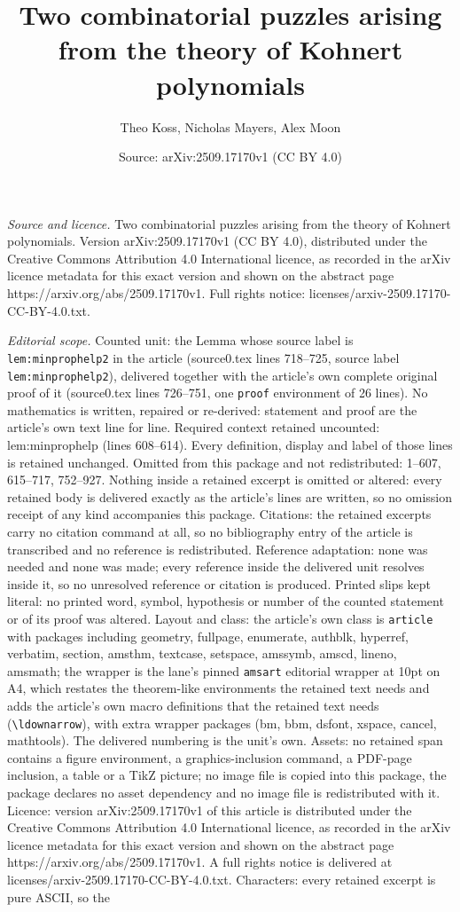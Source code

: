 \documentclass[10pt,a4paper]{amsart}
\title[Two combinatorial puzzles arising from the theory of Kohnert]{Two combinatorial puzzles arising from the theory of Kohnert polynomials}
\author{Theo Koss, Nicholas Mayers, Alex Moon}
\date{Source: arXiv:2509.17170v1 (CC BY 4.0)}
\begin{document}
\maketitle

\noindent\emph{Source and licence.} Two combinatorial puzzles arising from the theory of Kohnert polynomials. Version arXiv:2509.17170v1 (CC BY 4.0), distributed under the Creative Commons Attribution 4.0 International licence, as recorded in the arXiv licence metadata for this exact version and shown on the abstract page https://arxiv.org/abs/2509.17170v1. Full rights notice: licenses/arxiv-2509.17170-CC-BY-4.0.txt.\par\smallskip

\noindent\textit{Editorial scope.} Counted unit: the Lemma whose source label is \texttt{lem:minprophelp2} in the article (source0.tex lines 718--725, source label \texttt{lem:minprophelp2}), delivered together with the article's own complete original proof of it (source0.tex lines 726--751, one \texttt{proof} environment of 26 lines). No mathematics is written, repaired or re-derived: statement and proof are the article's own text line for line. Required context retained uncounted: lem:minprophelp (lines 608--614). Every definition, display and label of those lines is retained unchanged. Omitted from this package and not redistributed: 1--607, 615--717, 752--927. Nothing inside a retained excerpt is omitted or altered: every retained body is delivered exactly as the article's lines are written, so no omission receipt of any kind accompanies this package. Citations: the retained excerpts carry no citation command at all, so no bibliography entry of the article is transcribed and no reference is redistributed. Reference adaptation: none was needed and none was made; every reference inside the delivered unit resolves inside it, so no unresolved reference or citation is produced. Printed slips kept literal: no printed word, symbol, hypothesis or number of the counted statement or of its proof was altered. Layout and class: the article's own class is \texttt{article} with packages including geometry, fullpage, enumerate, authblk, hyperref, verbatim, section, amsthm, textcase, setspace, amssymb, amscd, lineno, amsmath; the wrapper is the lane's pinned \texttt{amsart} editorial wrapper at 10pt on A4, which restates the theorem-like environments the retained text needs and adds the article's own macro definitions that the retained text needs (\texttt{\textbackslash ldownarrow}), with extra wrapper packages (bm, bbm, dsfont, xspace, cancel, mathtools). The delivered numbering is the unit's own. Assets: no retained span contains a figure environment, a graphics-inclusion command, a PDF-page inclusion, a table or a TikZ picture; no image file is copied into this package, the package declares no asset dependency and no image file is redistributed with it. Licence: version arXiv:2509.17170v1 of this article is distributed under the Creative Commons Attribution 4.0 International licence, as recorded in the arXiv licence metadata for this exact version and shown on the abstract page https://arxiv.org/abs/2509.17170v1. A full rights notice is delivered at licenses/arxiv-2509.17170-CC-BY-4.0.txt. Characters: every retained excerpt is pure ASCII, so the 
\end{document}
